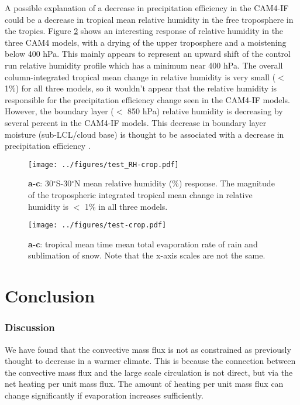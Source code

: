 \documentclass[letterpaper,12pt,titlepage,oneside,final]{book}
\begin{document}
A possible explanation of a decrease in precipitation efficiency in the CAM4-IF could be a decrease in tropical mean relative humidity in the free troposphere in the tropics. Figure \ref{fig:RH} shows an interesting response of relative humidity in the three CAM4 models, with a drying of the upper troposphere and a moistening below 400 hPa. This mainly appears to represent an upward shift of the control run relative humidity profile which has a minimum near 400 hPa. The overall column-integrated tropical mean change in relative humidity is very small ($<$ 1\%) for all three models, so it wouldn't appear that the relative humidity is responsible for the precipitation efficiency change seen in the CAM4-IF models. However, the boundary layer ($<$ 850 hPa) relative humidity is decreasing by several percent in the CAM4-IF models. This decrease in boundary layer moisture (sub-LCL/cloud base) is thought to be associated with a decrease in precipitation efficiency \citep{market_precipitation_2003,sherwood_spread_2014}. 
\begin{figure}[H]
\centering
\noindent\texttt{[image: ../figures/test\_RH-crop.pdf]}\hfill
\caption{\textbf{a-c}: 30$^{\circ}$S-30$^{\circ}$N mean relative humidity (\%) response. The magnitude of the tropospheric integrated tropical mean change in relative humidity is $<$ 1\% in all three models. }
\label{fig:RH}
\end{figure}
\begin{figure}[H]
\centering
\noindent\texttt{[image: ../figures/test-crop.pdf]}\hfill
\caption{\textbf{a-c}: tropical mean time mean total evaporation rate of rain and sublimation of snow. Note that the x-axis scales are not the same.}
\label{fig:RH}
\end{figure}

\chapter{Conclusion}
\subsection{Discussion}
We have found that the convective mass flux is not as constrained as previously thought to decrease in a warmer climate. This is because the connection between the convective mass flux and the large scale circulation is not direct, but via the net heating per unit mass flux. The amount of heating per unit mass flux can change significantly if evaporation increases sufficiently.
\end{document}
